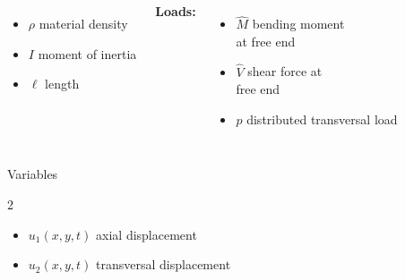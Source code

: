 \documentclass[aspectratio=169]{beamer}
\begin{document}
\begin{frame}
\begin{columns}
{\begin{itemize}
        \item $\rho$ material density
        \item $I$ moment of inertia
        \item $\ell$ length
      \end{itemize}}
    {\tiny \textbf{Loads:}
      \begin{itemize}\setlength\itemsep{0.05em}
        \item  $\hat M$  bending moment \\ at free end
        \item  $\hat V$ shear force at \\ free end
        \item $p$ distributed transversal load
      \end{itemize}
    }
  \end{columns}
  \begin{block}{Variables}
    \begin{multicols}{2}
      \begin{itemize}\setlength\itemsep{0.05em}
        \item $u_{1}(x,y,t)$ axial displacement
        \item $u_{2}(x,y,t)$ transversal displacement\vspace{.1cm}
      \end{itemize}
    \end{multicols}
  \end{block}
\end{frame}
\end{document}
